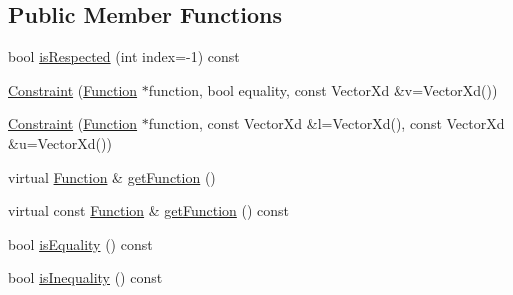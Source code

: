 \subsection*{Public Member Functions}
\begin{DoxyCompactItemize}
\item 
bool \hyperlink{classocra_1_1Constraint_3_01Function_01_4_aa31c0ebbe543657b06e5e9e35ecee299}{is\+Respected} (int index=-\/1) const 
\end{DoxyCompactItemize}
{\bf }\par
\begin{DoxyCompactItemize}
\item 
\hyperlink{classocra_1_1Constraint_3_01Function_01_4_aefef89fd502e8f1fed23be307f71b508}{Constraint} (\hyperlink{classocra_1_1Function}{Function} $\ast$function, bool equality, const Vector\+Xd \&v=Vector\+Xd())
\item 
\hyperlink{classocra_1_1Constraint_3_01Function_01_4_a9b8a02fdfb62c2d3d774552baccd268b}{Constraint} (\hyperlink{classocra_1_1Function}{Function} $\ast$function, const Vector\+Xd \&l=Vector\+Xd(), const Vector\+Xd \&u=Vector\+Xd())
\end{DoxyCompactItemize}

{\bf }\par
\begin{DoxyCompactItemize}
\item 
virtual \hyperlink{classocra_1_1Function}{Function} \& \hyperlink{classocra_1_1Constraint_3_01Function_01_4_a81f1d8de34c0a123bc77d4798619fe9b}{get\+Function} ()
\item 
virtual const \hyperlink{classocra_1_1Function}{Function} \& \hyperlink{classocra_1_1Constraint_3_01Function_01_4_a4708dc1df1d477a728fa2d7ddaf496e7}{get\+Function} () const 
\end{DoxyCompactItemize}

{\bf }\par
\begin{DoxyCompactItemize}
\item 
bool \hyperlink{classocra_1_1Constraint_3_01Function_01_4_a243e1593bef3766454f2f2ad527605d1}{is\+Equality} () const 
\item 
bool \hyperlink{classocra_1_1Constraint_3_01Function_01_4_a95efe81d0c7bed5bd78aa0a95820fd77}{is\+Inequality} () const 
\end{DoxyCompactItemize}

